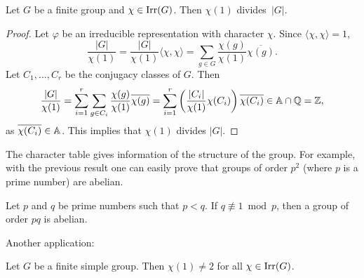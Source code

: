 \label{degree}

\begin{theorem}[Frobenius]
\label{thm:Frobenius_chi(1)}
    Let $G$ be a finite group and $\chi\in\operatorname{Irr}(G)$. 
    Then $\chi(1)$ divides~$|G|$. 
\end{theorem}

\begin{proof}
    Let $\varphi$ be an irreducible representation with character $\chi$. 
    Since $\langle\chi,\chi\rangle=1$, 
    \[
    \frac{|G|}{\chi(1)}=\frac{|G|}{\chi(1)}\langle\chi,\chi\rangle
    =\sum_{g\in G}\frac{\chi(g)}{\chi(1)}\overline{\chi(g)}.
    \]
    Let $C_1,\dots,C_r$ be the conjugacy classes of $G$. 
    Then 
    \[
        \frac{|G|}{\chi(1)}
        =\sum_{i=1}^r\sum_{g\in C_i}\frac{\chi(g)}{\chi(1)}\overline{\chi(g)}
        =\sum_{i=1}^r\left(\frac{|C_i|}{\chi(1)}\chi(C_i)\right)\overline{\chi(C_i)}\in\mathbb{A}\cap\mathbb{Q}=\mathbb{Z},
    \]
    as $\overline{\chi(C_i)}\in\mathbb{A}$. This implies that $\chi(1)$ divides $|G|$. 
\end{proof}

The character table gives information of the structure of the group. For example,
with the previous result one can easily prove that
groups of order $p^2$ (where $p$ is a prime number) are abelian. 

\begin{exercise}
    Let $p$ and $q$ be prime numbers such that $p<q$.
    If $q\not\equiv1\bmod p$, then a group of order $pq$ is abelian. 
\end{exercise}

Another application:

\begin{theorem}
    Let $G$ be a finite simple group. 
    Then $\chi(1)\ne2$ for all $\chi\in\operatorname{Irr}(G)$. 
\end{theorem}

